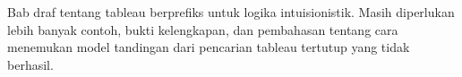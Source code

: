 \documentclass[../../../include/open-logic-chapter]{subfiles}
\begin{document}

\begin{editorial}
  Bab draf tentang tableau berprefiks untuk logika intuisionistik. Masih
  diperlukan lebih banyak contoh, bukti kelengkapan, dan pembahasan tentang
  cara menemukan model tandingan dari pencarian tableau tertutup yang tidak
  berhasil.
\end{editorial}


\OLEndChapterHook
\end{document}
